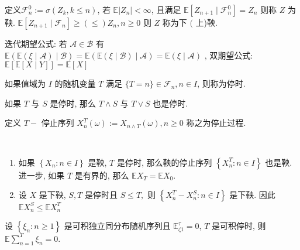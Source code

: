 \documentclass[10pt]{yerbaformat}
\begin{document}
\begin{definition}[鞅]
    定义$\mathcal{F}_{n}^{0}:=\sigma\left(Z_{k}, k \leq n\right)$, 若 $\mathbb{E}\left|Z_{n}\right|<\infty$, 且满足 $\mathbb{E}\left[Z_{n+1} \mid \mathcal{F}_{n}^{0}\right]=Z_{n}$ 则称 $Z$ 为鞅. $\mathbb{E}\left[Z_{n+1} \mid \mathcal{F}_{n}\right] \geq(\leq) Z_{n}, n \geq 0$ 则 $Z$ 称为下 $($ 上)鞅.
\end{definition}

\par 迭代期望公式: 若 $\mathcal{A} \in \mathcal{B}$ 有 $\mathbb{E}(\mathbb{E}(\xi \mid \mathcal{A}) \mid \mathcal{B})=\mathbb{E}(\mathbb{E}(\xi \mid \mathcal{B}) \mid \mathcal{A})=\mathbb{E}(\xi \mid \mathcal{A})$ , 双期望公式: $\mathbb{E}[\mathbb{E}[X \mid Y]]=\mathbb{E}\left[{X}\right]$


\begin{definition}[停时]
    如果值域为 $I$ 的随机变量 $T$ 满足 $\{T=n\} \in \mathcal{F}_{n}, n \in I$, 则称为停时.
\end{definition}

\begin{lemma}
    如果 $T$ 与 $S$ 是停时, 那么 $T \wedge S$ 与 $T \vee S$ 也是停时.
\end{lemma}

\begin{definition}[停止过程]
    定义 $T-$ 停止序列 $X_{n}^{T}(\omega):=X_{n \wedge T}(\omega), n \geq 0$ 称之为停止过程.
\end{definition}

\begin{theorem}
    \
    \begin{enumerate}
        \item 如果 $\left\{X_{n}: n \in I\right\}$ 是鞅, $T$ 是停时, 那么鞅的停止序列 $\left\{X_{n}^{T}: n \in I\right\}$ 也是鞅. 进一步, 如果 $T$ 是有界的, 那么 $\mathbb{E} X_{T}=\mathbb{E} X_{0}$.
        \item 设 $X$ 是下鞅, $S, T$ 是停时且 $S \leq T,$ 则 $\left\{X_{n}^{T}-X_{n}^{S}: n \in I\right\}$ 是下鞅. 因此 $\mathbb{E} X_{n}^{S} \leq \mathbb{E} X_{n}^{T}$
    \end{enumerate}
\end{theorem}

\begin{theorem}[Wald 等式]
    设 $\left\{\xi_{n}: n \geq 1\right\}$ 是可积独立同分布随机序列且 $\mathbb{E}_{\zeta 1}^{\tau}=0$, $T$ 是可积停时, 则 $\mathbb{E} \sum_{n=1}^{T} \xi_{n}=0 .$
\end{theorem}
\end{document}
